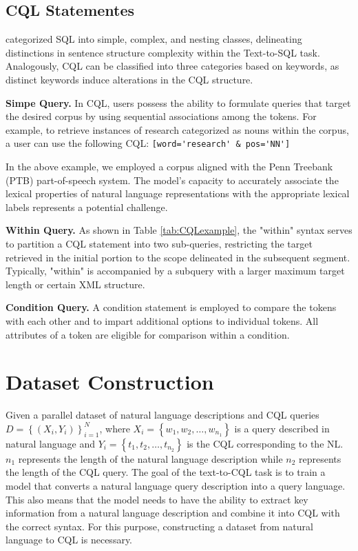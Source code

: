\documentclass[11pt]{article}
\begin{document}
\begin{CJK*}{UTF8}{gbsn}
 

\subsection{CQL Statementes}
\citet{pourreza2023dinsql} categorized SQL into simple, complex, and nesting classes, delineating distinctions in sentence structure complexity within the Text-to-SQL task. Analogously, CQL can be classified into three categories based on keywords, as distinct keywords induce alterations in the CQL structure.

\textbf{Simpe Query.} In CQL, users possess the ability to formulate queries that target the desired corpus by using sequential associations among the tokens. For example, to retrieve instances of research categorized as nouns within the corpus, a user can use the following CQL:
\verb|[word='research' & pos='NN']|

In the above example, we employed a corpus aligned with the Penn Treebank (PTB) \citep{ptb} part-of-speech system. The model's capacity to accurately associate the lexical properties of natural language representations with the appropriate lexical labels represents a potential challenge.

\textbf{Within Query.} As shown in Table \ref{tab:CQLexample}, the "within" syntax serves to partition a CQL statement into two sub-queries, restricting the target retrieved in the initial portion to the scope delineated in the subsequent segment. Typically, "within" is accompanied by a subquery with a larger maximum target length or certain XML structure. 

\textbf{Condition Query.} A condition statement is employed to compare the tokens with each other and to impart additional options to individual tokens. All attributes of a token are eligible for comparison within a condition.



\section{Dataset Construction }

Given a parallel dataset of natural language descriptions and CQL queries $D = \left\{(X_i, Y_i)\right\}_{i=1}^N$, where $X_i = \left\{w_1, w_2, \ldots, w_{n_1}\right\}$ is a query described in natural language and $Y_i = \left\{t_1, t_2, \ldots, t_{n_2}\right\}$ is the CQL corresponding to the NL. $n_1$ represents the length of the natural language description while $n_2$ represents the length of the CQL query. The goal of the text-to-CQL task is to train a model that converts a natural language query description into a query language. This also means that the model needs to have the ability to extract key information from a natural language description and combine it into CQL with the correct syntax. For this purpose, constructing a dataset from natural language to CQL is necessary.


\end{CJK*}
\end{document}
